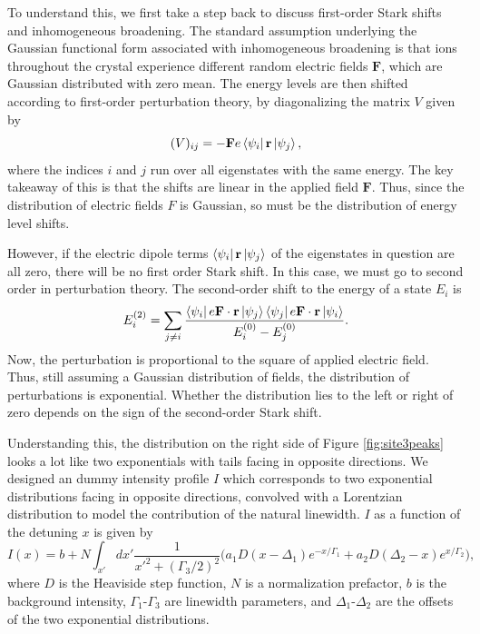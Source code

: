 \documentclass[12pt]{puthesis}
\begin{document}
To understand this, we first take a step back to discuss first-order Stark shifts and inhomogeneous broadening. The standard assumption underlying the Gaussian functional form associated with inhomogeneous broadening is that ions throughout the crystal experience different random electric fields $\mathbf{F}$, which are Gaussian distributed with zero mean. The energy levels are then shifted according to first-order perturbation theory, by diagonalizing the matrix $V$ given by
\begin{equation}\label{eq:2}
  (V)_{ij} = -\mathbf{F}e\bra{\psi_{i}}\mathbf{r}\ket{\psi_{j}},
\end{equation}
where the indices $i$ and $j$ run over all eigenstates with the same energy. The key takeaway of this is that the shifts are linear in the applied field $\mathbf{F}$. Thus, since the distribution of electric fields $F$ is Gaussian, so must be the distribution of energy level shifts.

However, if the electric dipole terms $\bra{\psi_{i}}\mathbf{r}\ket{\psi_{j}}$ of the eigenstates in question are all zero, there will be no first order Stark shift. In this case, we must go to second order in perturbation theory. The second-order shift to the energy of a state $E_{i}$ is 
\begin{equation}\label{eq:8}
E_{i}^{(2)} = \sum_{j\neq i }\frac{\bra{\psi_{i}}e\mathbf{F}\cdot\mathbf{r}\ket{\psi_{j}}\bra{\psi_{j}}e\mathbf{F}\cdot\mathbf{r}\ket{\psi_{i}}}{E_{i}^{(0)}-E_{j}^{(0)}}.
\end{equation}
Now, the perturbation is proportional to the square of applied electric field. Thus, still assuming a Gaussian distribution of fields, the distribution of perturbations is exponential. Whether the distribution lies to the left or right of zero depends on the sign of the second-order Stark shift.

Understanding this, the distribution on the right side of Figure \ref{fig:site3peaks} looks a lot like two exponentials with tails facing in opposite directions. We designed an dummy intensity profile $I$ which corresponds to two exponential distributions facing in opposite directions, convolved with a Lorentzian distribution to model the contribution of the natural linewidth. $I$ as a function of the detuning $x$ is given by \begin{equation}\label{eq:1}
  I(x) = b+N\int_{x'}dx'\frac{1}{x'^{2}+(\Gamma_{3}/2)^{2}}\Big(
    a_{1} D(x - \Delta_{1}) e^{-x/\Gamma_{1}} + a_{2}D(\Delta_{2}-x)e^{x/\Gamma_{2}}
  \Big) ,
\end{equation}
where $D$ is the Heaviside step function, $N$ is a normalization prefactor, $b$ is the background intensity, $\Gamma_{1}$-$\Gamma_{3}$ are linewidth parameters, and $\Delta_{1}$-$\Delta_{2}$ are the offsets of the two exponential distributions.
\end{document}

